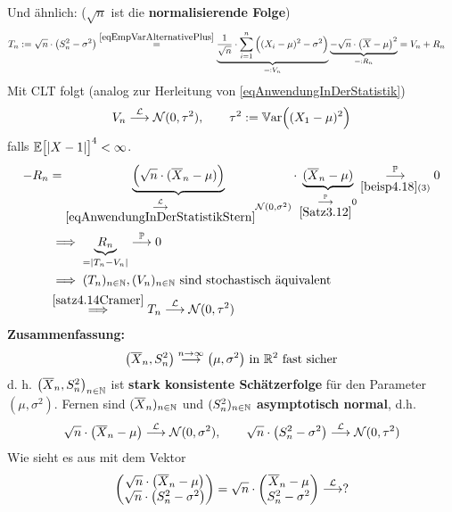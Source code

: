 Und ähnlich: ($\sqrt{n}$ ist die \textbf{normalisierende Folge})
\begin{align*}
	T_n&:=\sqrt{n}\cdot\left(S_n^2-\sigma^2\right)
	\stackrel{\eqref{eqEmpVarAlternativePlus}}{=}
	\underbrace{\frac{1}{\sqrt{n}}\cdot\sum\limits_{i=1}^n\Big((X_i-\mu)^2-\sigma^2\Big)}_{=:V_n}\underbrace{-\sqrt{n}\cdot\big(\overline{X}-\mu\big)^2}_{=:R_n}
	=V_n+R_n
\end{align*}
Mit CLT folgt (analog zur Herleitung von \eqref{eqAnwendungInDerStatistik})
\begin{align*}
	V_n\stackrel{\mathcal{L}}{\longrightarrow}\mathcal{N}(0,\tau^2),\qquad\tau^2:=\mathbb{V}\text{ar}\Big((X_1-\mu)^2\Big)
\end{align*}
falls $\mathbb{E}\big[|X-1|\big]^4<\infty$.
\begin{align*}
	-R_n&=\underbrace{\Big(\sqrt{n}\cdot(\overline{X}_n-\mu)\Big)}_{\underset{\eqref{eqAnwendungInDerStatistikStern}}{\overset{\mathcal{L}}{\longrightarrow}}\mathcal{N}(0,\sigma^2)}\cdot\underbrace{(\overline{X}_n-\mu)}_{\underset{\ref{Satz3.12}}{\overset{\mathbb{P}}{\longrightarrow}}0}\underset{\ref{beisp4.18}(3)}{\overset{\mathbb{P}}{\longrightarrow}}0\\
	&\implies \underbrace{R_n}_{=|T_n-V_n|}\stackrel{\mathbb{P}}{\longrightarrow}0\\
	&\implies(T_n)_{n\in\mathbb{N}},(V_n)_{n\in\mathbb{N}}\text{ sind stochastisch äquivalent}\\
	&\stackrel{\ref{satz4.14Cramer}}{\implies}
	T_n\stackrel{\mathcal{L}}{\longrightarrow}\mathcal{N}(0,\tau^2)
\end{align*}
\textbf{Zusammenfassung:}
\begin{align*}
	\big(\overline{X}_n,S_n^2\big)\stackrel{n\to\infty}{\longrightarrow}\big(\mu,\sigma^2\big)\text{ in }\mathbb{R}^2\text{ fast sicher}
\end{align*}
d. h. $\big(\overline{X}_n,S_n^2\big)_{n\in\mathbb{N}}$ ist \textbf{stark konsistente Schätzerfolge} für den Parameter $(\mu,\sigma^2)$.
Fernen sind $(\overline{X}_n)_{n\in\mathbb{N}}$ und $(S_n^2)_{n\in\mathbb{N}}$ \textbf{asymptotisch normal}, d.h.
\begin{align*}
	\sqrt{n}\cdot\big(\overline{X}_n-\mu\big)\stackrel{\mathcal{L}}{\longrightarrow}\mathcal{N}(0,\sigma^2),\qquad
	\sqrt{n}\cdot\big(S_n^2-\sigma^2\big)\stackrel{\mathcal{L}}{\longrightarrow}\mathcal{N}(0,\tau^2)
\end{align*}
Wie sieht es aus mit dem Vektor 
\begin{align*}
	\begin{pmatrix}
		\sqrt{n}\cdot\big(\overline{X}_n-\mu\big)\\
		\sqrt{n}\cdot\big(S_n^2-\sigma^2\big)
	\end{pmatrix}
	=\sqrt{n}\cdot\begin{pmatrix}
		\overline{X}_n-\mu\\
		S_n^2-\sigma^2
	\end{pmatrix}
	\stackrel{\mathcal{L}}{\longrightarrow}?
\end{align*}

